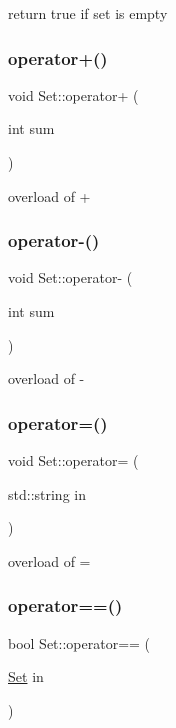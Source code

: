 return true if set is empty \mbox{\label{classSet_a33786bba5f634c5023d047b5f1f1a292}} 
\subsubsection{\texorpdfstring{operator+()}{operator+()}}
{\footnotesize\ttfamily void Set\+::operator+ (\begin{DoxyParamCaption}\item[{int}]{sum }\end{DoxyParamCaption})}

overload of + \mbox{\label{classSet_a1e58afdc9befac1dbe295a0bdccfeacb}} 
\subsubsection{\texorpdfstring{operator-\/()}{operator-()}}
{\footnotesize\ttfamily void Set\+::operator-\/ (\begin{DoxyParamCaption}\item[{int}]{sum }\end{DoxyParamCaption})}

overload of -\/ \mbox{\label{classSet_a7f28cadb13f4cc86a87f64b9f885877a}} 
\subsubsection{\texorpdfstring{operator=()}{operator=()}}
{\footnotesize\ttfamily void Set\+::operator= (\begin{DoxyParamCaption}\item[{std\+::string}]{in }\end{DoxyParamCaption})}

overload of = \mbox{\label{classSet_a3087ba7a27e33fbb1b2a091c405ba046}} 
\subsubsection{\texorpdfstring{operator==()}{operator==()}}
{\footnotesize\ttfamily bool Set\+::operator== (\begin{DoxyParamCaption}\item[{\hyperlink{classSet}{Set}}]{in }\end{DoxyParamCaption})}

